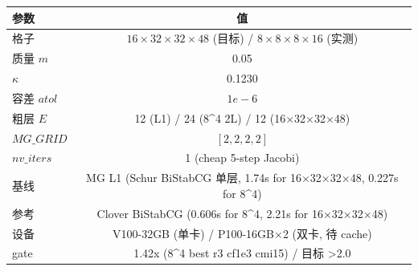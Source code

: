 \begin{tabular}{l c}
\hline
参数 & 值 \\
\hline
格子 & $16\times32\times32\times48$ (目标) / $8\times8\times8\times16$ (实测) \\
质量 $m$ & 0.05 \\
$\kappa$ & 0.1230 \\
容差 $atol$ & $1e-6$ \\
粗层 $E$ & 12 (L1) / 24 (8^4 2L) / 12 (16×32×32×48) \\
$MG\_GRID$ & $[2,2,2,2]$ \\
$nv\_iters$ & 1 (cheap 5-step Jacobi) \\
基线 & MG L1 (Schur BiStabCG 单层, 1.74s for 16×32×32×48, 0.227s for 8^4) \\
参考 & Clover BiStabCG (0.606s for 8^4, 2.21s for 16×32×32×48) \\
设备 & V100-32GB (单卡) / P100-16GB×2 (双卡, 待 cache) \\
gate & 1.42x (8^4 best r3 cf1e3 cmi15) / 目标 >2.0 \\
\hline
\end{tabular}
